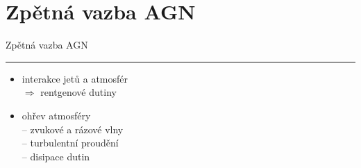 \documentclass[aspectratio=43]{beamer}
\begin{document}
\section{Zpětná vazba AGN}

\begin{frame}{\vspace{-2mm}Zpětná vazba AGN\phantom{j$^1$}\\\vspace{1.5mm}\hrule}
\vspace{-10mm}
\begin{itemize}
    \item<1-> interakce jetů a atmosfér\\ \vspace{2.2mm}
        $\Rightarrow$ rentgenové dutiny\\ \vspace{3mm}
    \item<3-> ohřev atmosféry\\ \vspace{2.2mm}
        -- zvukové a rázové vlny\\ \vspace{2.3mm}
        -- turbulentní proudění\\ \vspace{2.2mm}
        -- disipace dutin\\ \vspace{3mm}
\end{itemize}
\begin{tikzpicture}[overlay]


\end{tikzpicture}
\end{frame}
\end{document}
